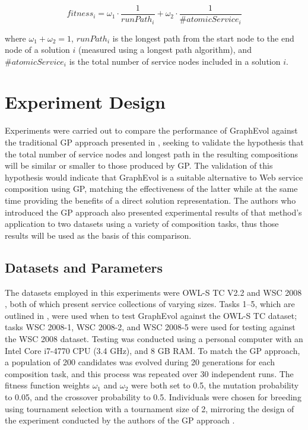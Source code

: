 \documentclass{article}
\begin{document}
\begin{equation}
 fitness_i = \omega_1 \cdot \frac{1}{runPath_i} + \omega_2 \cdot \frac{1}{\#atomicService_i}
\end{equation}

\noindent where $ \omega_1 + \omega_2 = 1$, $runPath_i$ is the longest path from the start node to the end node of a solution $i$ (measured using a longest
path algorithm), and $\#atomicService_i$ is the total number of service nodes included in a solution $i$.

\section{Experiment Design}\label{experimentdesign}
Experiments were carried out to compare the performance of GraphEvol against the traditional GP approach presented in \cite{rodriguez2010composition}, seeking to validate
the hypothesis that the total number of service nodes and longest path in the resulting compositions will be similar or smaller to those produced
by GP. The validation of this hypothesis would indicate that GraphEvol is a suitable alternative to Web service composition using GP, matching the effectiveness of the
latter while at the same time providing the benefits of a direct solution representation. The authors who introduced the GP approach also presented experimental
results of that method's application to two datasets using a variety of composition tasks, thus those results will be used as the basis of this comparison.

\subsection{Datasets and Parameters}
The datasets employed in this experiments were OWL-S TC V2.2 \cite{kuster2008opossum} and WSC 2008 \cite{bansal2008wsc}, both of which present service collections
of varying sizes. Tasks 1--5, which are outlined in \cite{rodriguez2010composition},
were used when to test GraphEvol against the OWL-S TC dataset; tasks WSC 2008-1, WSC 2008-2, and WSC 2008-5 were used for testing against the WSC 2008 dataset.
Testing was conducted using a personal computer with an Intel Core i7-4770 CPU (3.4 GHz), and 8 GB RAM. To match the GP approach, a population of 200 candidates was
evolved during 20 generations for each composition task, and this process was repeated over 30 independent runs. The fitness function weights $\omega_1$ and $\omega_2$
were both set to 0.5, the mutation probability to 0.05, and the crossover probability to 0.5. Individuals were chosen for breeding using tournament selection with a 
tournament size of 2, mirroring the design of the experiment conducted by the authors of the GP approach \cite{rodriguez2010composition}.
\end{document}
